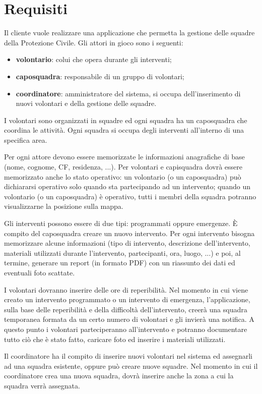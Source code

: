 \section{Requisiti}

Il cliente vuole realizzare una applicazione che permetta la gestione delle squadre della Protezione Civile.  
Gli attori in gioco sono i seguenti: 
\begin{itemize}
	\item \textbf{volontario}: colui che opera durante gli interventi; 
	\item \textbf{caposquadra}: responsabile di un gruppo di volontari; 
	\item \textbf{coordinatore}: amministratore del sistema, si occupa dell'inserimento di nuovi volontari e della gestione delle squadre.
\end{itemize}

I volontari sono organizzati in squadre ed ogni squadra ha un caposquadra che coordina le attività. Ogni squadra si occupa degli interventi all’interno di una specifica area.

Per ogni attore devono essere memorizzate le informazioni anagrafiche di base (nome, cognome, CF, residenza, ...). Per volontari e capisquadra dovrà essere memorizzato anche lo stato operativo: un volontario (o un caposquadra) può dichiararsi operativo solo quando sta partecipando ad un intervento; quando un volontario (o un caposquadra) è operativo, tutti i membri della squadra potranno visualizzarne la posizione sulla mappa. 

Gli interventi possono essere di due tipi: programmati oppure emergenze. È compito del caposquadra creare un nuovo intervento. Per ogni intervento bisogna memorizzare alcune informazioni (tipo di intervento, descrizione dell'intervento, materiali utilizzati durante l’intervento, partecipanti, ora, luogo, ...) e poi, al termine, generare un report (in formato PDF) con un riassunto dei dati ed eventuali foto scattate.

I volontari dovranno inserire delle ore di reperibilità. Nel momento in cui viene creato un intervento programmato o un intervento di emergenza, l’applicazione, sulla base delle reperibilità e della difficoltà dell’intervento, creerà una squadra temporanea formata da un certo numero di volontari e gli invierà una notifica. A questo punto i volontari parteciperanno all’intervento e potranno documentare tutto ciò che è stato fatto, caricare foto ed inserire i materiali utilizzati.

Il coordinatore ha il compito di inserire nuovi volontari nel sistema ed assegnarli ad una squadra esistente, oppure può creare nuove squadre. Nel momento in cui il coordinatore crea una nuova squadra, dovrà inserire anche la zona a cui la squadra verrà assegnata.

